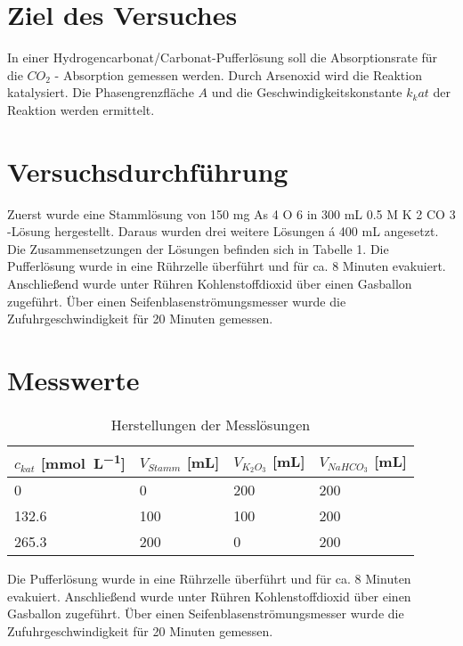 \documentclass{article}
\begin{document}
%
%

\noindent
\begin{onehalfspace}

\section{Ziel des Versuches}
In einer Hydrogencarbonat/Carbonat-Pufferlösung soll die Absorptionsrate für die $CO_2$ -
Absorption gemessen werden. Durch Arsenoxid wird die Reaktion katalysiert. Die
Phasengrenzfläche $A$ und die Geschwindigkeitskonstante $k_kat$ der Reaktion werden ermittelt.
\section{Versuchsdurchführung}
Zuerst wurde eine Stammlösung von 150 mg As 4 O 6 in 300 mL 0.5 M K 2 CO 3 -Lösung hergestellt.
Daraus wurden drei weitere Lösungen á 400 mL angesetzt. Die Zusammensetzungen der
Lösungen befinden sich in Tabelle 1.
Die Pufferlösung wurde in eine Rührzelle überführt und für ca. 8 Minuten evakuiert.
Anschließend wurde unter Rühren Kohlenstoffdioxid über einen Gasballon zugeführt. Über
einen Seifenblasenströmungsmesser wurde die Zufuhrgeschwindigkeit für 20 Minuten
gemessen.
\section{Messwerte}
\begin{table}[ht!]
  \centering
 \begin{tabularx}{\textwidth}{XXXX}
$c_{kat}$ [\si{\milli\mol\per\liter}] & $V_{Stamm}$ [\si{\milli\liter}]  & $V_{K_2O_3}$ [\si{\milli\liter}] & $V_{NaHCO_3}$ [\si{\milli\liter}]  \\
\hline
\rowcolor{LightCyan}
0  & 0 & 200 & 200\\
132.6  & 100 & 100 & 200\\
\rowcolor{LightCyan}
265.3 & 200 & 0 & 200\\
\end{tabularx}
  \caption{Herstellungen der Messlösungen}
\end{table}
Die Pufferlösung wurde in eine Rührzelle überführt und für ca. 8 Minuten evakuiert.
Anschließend wurde unter Rühren Kohlenstoffdioxid über einen Gasballon zugeführt. Über
einen Seifenblasenströmungsmesser wurde die Zufuhrgeschwindigkeit für 20 Minuten
gemessen.

\end{onehalfspace}
\end{document}
